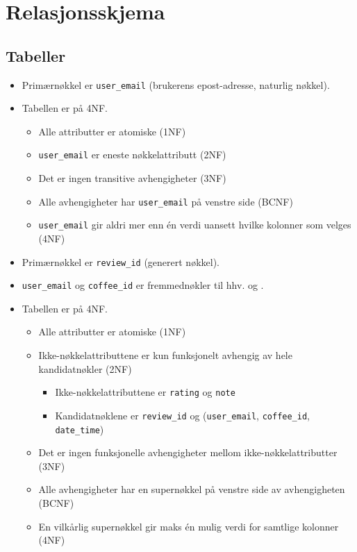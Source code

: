\section{Relasjonsskjema}

\subsection{Tabeller}

\vspace{0.3cm}


\begin{itemize}
    \item Primærnøkkel er \verb|user_email| (brukerens epost-adresse, naturlig nøkkel).
    \item Tabellen er på 4NF.
    \begin{itemize}
        \item Alle attributter er atomiske (1NF)
        \item \verb|user_email| er eneste nøkkelattributt (2NF)
        \item Det er ingen transitive avhengigheter (3NF)
        \item Alle avhengigheter har \verb|user_email| på venstre side (BCNF)
        \item \verb|user_email| gir aldri mer enn én verdi uansett hvilke kolonner som velges (4NF) 
    \end{itemize}
\end{itemize}

\vspace{0.5cm}


\begin{itemize}
    \item Primærnøkkel er \verb|review_id| (generert nøkkel).
    \item \verb|user_email| og \verb|coffee_id| er fremmednøkler til hhv.  og .
    \item Tabellen er på 4NF.
    \begin{itemize}
        \item Alle attributter er atomiske (1NF)
        \item Ikke-nøkkelattributtene er kun funksjonelt avhengig av hele kandidatnøkler (2NF)
        \begin{itemize}
            \item Ikke-nøkkelattributtene er \verb|rating| og \verb|note|
            \item Kandidatnøklene er \verb|review_id| og (\verb|user_email|, \verb|coffee_id|, \verb|date_time|)
        \end{itemize}
        \item Det er ingen funksjonelle avhengigheter mellom ikke-nøkkelattributter (3NF)
        \item Alle avhengigheter har en supernøkkel på venstre side av avhengigheten (BCNF)
        \item En vilkårlig supernøkkel gir maks én mulig verdi for samtlige kolonner (4NF)
    \end{itemize}
\end{itemize}

